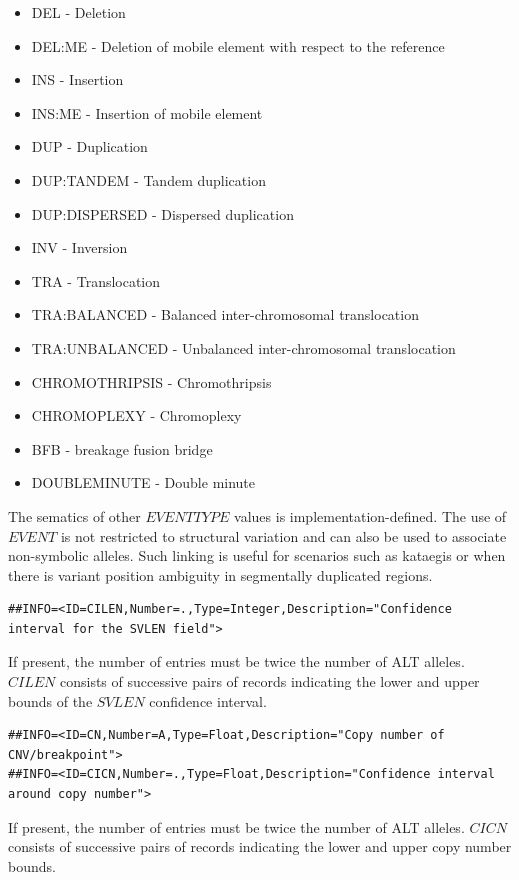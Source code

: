 \documentclass[8pt]{article}
\begin{document}
\begin{itemize}
  \item DEL - Deletion
  \item DEL:ME - Deletion of mobile element with respect to the reference
  \item INS - Insertion
  \item INS:ME - Insertion of mobile element
  \item DUP - Duplication
  \item DUP:TANDEM - Tandem duplication
  \item DUP:DISPERSED - Dispersed duplication
  \item INV - Inversion
  \item TRA - Translocation
  \item TRA:BALANCED - Balanced inter-chromosomal translocation
  \item TRA:UNBALANCED - Unbalanced inter-chromosomal translocation
  \item CHROMOTHRIPSIS - Chromothripsis
  \item CHROMOPLEXY - Chromoplexy
  \item BFB - breakage fusion bridge
  \item DOUBLEMINUTE - Double minute
\end{itemize}
The sematics of other $EVENTTYPE$ values is implementation-defined.
The use of $EVENT$ is not restricted to structural variation and can also be used to associate non-symbolic alleles.
Such linking is useful for scenarios such as kataegis or when there is variant position ambiguity in segmentally duplicated regions.

\footnotesize
\begin{verbatim}
##INFO=<ID=CILEN,Number=.,Type=Integer,Description="Confidence interval for the SVLEN field">
\end{verbatim}
\normalsize

If present, the number of entries must be twice the number of ALT alleles.
$CILEN$ consists of successive pairs of records indicating the lower and upper bounds of the $SVLEN$ confidence interval.

\footnotesize
\begin{verbatim}
##INFO=<ID=CN,Number=A,Type=Float,Description="Copy number of CNV/breakpoint">
##INFO=<ID=CICN,Number=.,Type=Float,Description="Confidence interval around copy number">
\end{verbatim}
\normalsize

If present, the number of entries must be twice the number of ALT alleles.
$CICN$ consists of successive pairs of records indicating the lower and upper copy number bounds.
\end{document}
